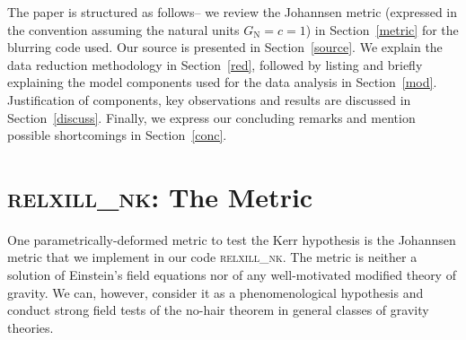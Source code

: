 \documentclass[aps,prd,twocolumn,superscriptaddress,nofootinbib,amsmath,amssymb]{revtex4-1}
\begin{document}
The paper is structured as follows-- we review the Johannsen metric (expressed in the convention assuming the natural units $G_{\textrm{N}}=c=1$) in Section~\ref{metric} for the blurring code used. Our source is presented in Section~\ref{source}. We explain the data reduction methodology in Section~\ref{red}, followed by listing and briefly explaining the model components used for the data analysis in Section~\ref{mod}. Justification of components, key observations and results are discussed in Section~\ref{discuss}. Finally, we express our concluding remarks and mention possible shortcomings in Section~\ref{conc}.


\section{\label{metric}\textsc{relxill\_nk}: The Metric}

One parametrically-deformed metric to test the Kerr hypothesis is the Johannsen metric \citep{Johannsen2013} that we implement in our code \textsc{relxill\_nk}. The metric is neither a solution of Einstein's field equations nor of any well-motivated modified theory of gravity. We can, however, consider it as a phenomenological hypothesis and conduct strong field tests of the no-hair theorem in general classes of gravity theories.
\end{document}
